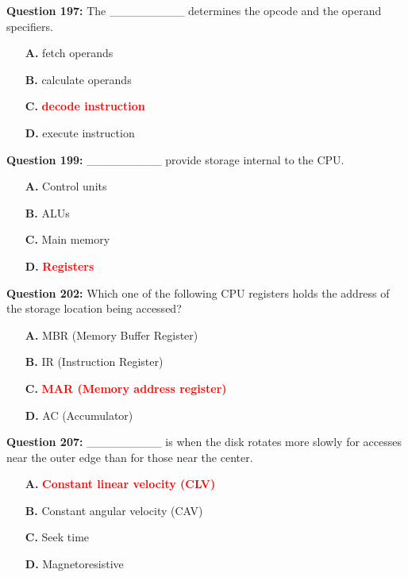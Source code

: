 \documentclass[12pt,a4paper]{article}
\begin{document}
\vspace{0.5cm}

\textbf{Question 197:} The _________ determines the opcode and the operand specifiers.

\begin{itemize}
    \item[\textbf{A.}] fetch operands
    \item[\textbf{B.}] calculate operands
    \item[\textbf{C.}] \textcolor{red}{\textbf{decode instruction}}
    \item[\textbf{D.}] execute instruction
\end{itemize}

\vspace{0.5cm}

\textbf{Question 199:} _________ provide storage internal to the CPU.

\begin{itemize}
    \item[\textbf{A.}] Control units
    \item[\textbf{B.}] ALUs
    \item[\textbf{C.}] Main memory
    \item[\textbf{D.}] \textcolor{red}{\textbf{Registers}}
\end{itemize}

\vspace{0.5cm}

\textbf{Question 202:} Which one of the following CPU registers holds the address of the storage location being accessed?

\begin{itemize}
    \item[\textbf{A.}] MBR (Memory Buffer Register)
    \item[\textbf{B.}] IR (Instruction Register)
    \item[\textbf{C.}] \textcolor{red}{\textbf{MAR (Memory address register)}}
    \item[\textbf{D.}] AC (Accumulator)
\end{itemize}

\vspace{0.5cm}

\textbf{Question 207:} _________ is when the disk rotates more slowly for accesses near the outer edge than for those near the center.

\begin{itemize}
    \item[\textbf{A.}] \textcolor{red}{\textbf{Constant linear velocity (CLV)}}
    \item[\textbf{B.}] Constant angular velocity (CAV)
    \item[\textbf{C.}] Seek time
    \item[\textbf{D.}] Magnetoresistive
\end{itemize}
\end{document}
